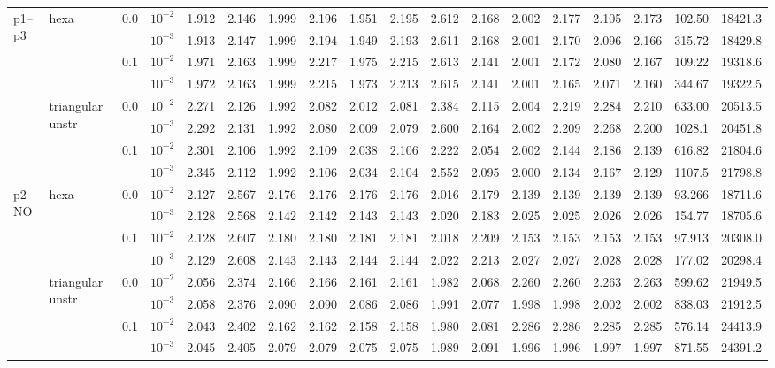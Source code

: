 \begin{longtable}{llclrrrrrrrrrrrrrr}
\multirow{8}{*}{p1--p3} & \multirow{4}{*}{hexa} & \multirow{2}{*}{0.0} & $10^{-2}$ & 1.912 & 2.146 & 1.999 & 2.196 & 1.951 & 2.195 & 2.612 & 2.168 & 2.002 & 2.177 & 2.105 & 2.173 & 102.50 & 18421.3 \\
& & & $10^{-3}$ & 1.913 & 2.147 & 1.999 & 2.194 & 1.949 & 2.193 & 2.611 & 2.168 & 2.001 & 2.170 & 2.096 & 2.166 & 315.72 & 18429.8 \\\cline{3-18}
& & \multirow{2}{*}{0.1} & $10^{-2}$ & 1.971 & 2.163 & 1.999 & 2.217 & 1.975 & 2.215 & 2.613 & 2.141 & 2.001 & 2.172 & 2.080 & 2.167 & 109.22 & 19318.6 \\
& & & $10^{-3}$ & 1.972 & 2.163 & 1.999 & 2.215 & 1.973 & 2.213 & 2.615 & 2.141 & 2.001 & 2.165 & 2.071 & 2.160 & 344.67 & 19322.5 \\\cline{2-18}
& \multirow{4}{*}{triangular unstr} & \multirow{2}{*}{0.0} & $10^{-2}$ & 2.271 & 2.126 & 1.992 & 2.082 & 2.012 & 2.081 & 2.384 & 2.115 & 2.004 & 2.219 & 2.284 & 2.210 & 633.00 & 20513.5 \\
& & & $10^{-3}$ & 2.292 & 2.131 & 1.992 & 2.080 & 2.009 & 2.079 & 2.600 & 2.164 & 2.002 & 2.209 & 2.268 & 2.200 & 1028.1 & 20451.8 \\\cline{3-18}
& & \multirow{2}{*}{0.1} & $10^{-2}$ & 2.301 & 2.106 & 1.992 & 2.109 & 2.038 & 2.106 & 2.222 & 2.054 & 2.002 & 2.144 & 2.186 & 2.139 & 616.82 & 21804.6 \\
& & & $10^{-3}$ & 2.345 & 2.112 & 1.992 & 2.106 & 2.034 & 2.104 & 2.552 & 2.095 & 2.000 & 2.134 & 2.167 & 2.129 & 1107.5 & 21798.8 \\\hline

\multirow{8}{*}{p2--NO} & \multirow{4}{*}{hexa} & \multirow{2}{*}{0.0} & $10^{-2}$ & 2.127 & 2.567 & 2.176 & 2.176 & 2.176 & 2.176 & 2.016 & 2.179 & 2.139 & 2.139 & 2.139 & 2.139 & 93.266 & 18711.6 \\
& & & $10^{-3}$ & 2.128 & 2.568 & 2.142 & 2.142 & 2.143 & 2.143 & 2.020 & 2.183 & 2.025 & 2.025 & 2.026 & 2.026 & 154.77 & 18705.6 \\\cline{3-18}
& & \multirow{2}{*}{0.1} & $10^{-2}$ & 2.128 & 2.607 & 2.180 & 2.180 & 2.181 & 2.181 & 2.018 & 2.209 & 2.153 & 2.153 & 2.153 & 2.153 & 97.913 & 20308.0 \\
& & & $10^{-3}$ & 2.129 & 2.608 & 2.143 & 2.143 & 2.144 & 2.144 & 2.022 & 2.213 & 2.027 & 2.027 & 2.028 & 2.028 & 177.02 & 20298.4 \\\cline{2-18}
& \multirow{4}{*}{triangular unstr} & \multirow{2}{*}{0.0} & $10^{-2}$ & 2.056 & 2.374 & 2.166 & 2.166 & 2.161 & 2.161 & 1.982 & 2.068 & 2.260 & 2.260 & 2.263 & 2.263 & 599.62 & 21949.5 \\
& & & $10^{-3}$ & 2.058 & 2.376 & 2.090 & 2.090 & 2.086 & 2.086 & 1.991 & 2.077 & 1.998 & 1.998 & 2.002 & 2.002 & 838.03 & 21912.5 \\\cline{3-18}
& & \multirow{2}{*}{0.1} & $10^{-2}$ & 2.043 & 2.402 & 2.162 & 2.162 & 2.158 & 2.158 & 1.980 & 2.081 & 2.286 & 2.286 & 2.285 & 2.285 & 576.14 & 24413.9 \\
& & & $10^{-3}$ & 2.045 & 2.405 & 2.079 & 2.079 & 2.075 & 2.075 & 1.989 & 2.091 & 1.996 & 1.996 & 1.997 & 1.997 & 871.55 & 24391.2 \\\hline


\end{longtable}
